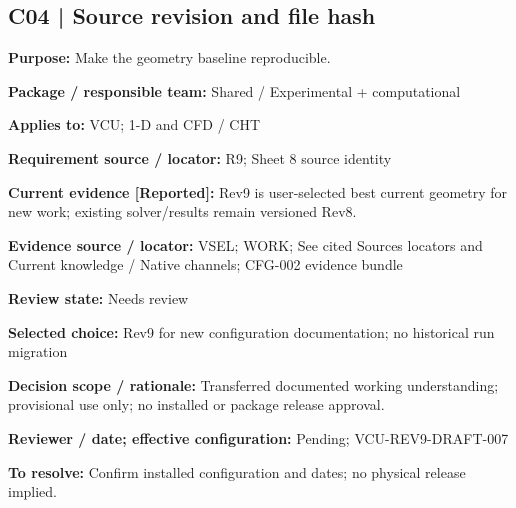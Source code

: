 \documentclass[11pt]{article}
\begin{document}
\par\noindent\begin{minipage}{\textwidth}\small\setlength{\parskip}{2pt}
\subsection*{C04 | Source revision and file hash}
\textbf{Purpose:} Make the geometry baseline reproducible.\par
\textbf{Package / responsible team:} Shared / Experimental + computational\par
\textbf{Applies to:} VCU; 1-D and CFD / CHT\par
\textbf{Requirement source / locator:} R9; Sheet 8 source identity\par
\textbf{Current evidence [Reported]:} Rev9 is user-selected best current geometry for new work; existing solver/results remain versioned Rev8.\par
\textbf{Evidence source / locator:} VSEL; WORK; See cited Sources locators and Current knowledge / Native channels; CFG-002 evidence bundle\par
\textbf{Review state:} Needs review\par
\textbf{Selected choice:} Rev9 for new configuration documentation; no historical run migration\par
\textbf{Decision scope / rationale:} Transferred documented working understanding; provisional use only; no installed or package release approval.\par
\textbf{Reviewer / date; effective configuration:} Pending; VCU-REV9-DRAFT-007\par
\textbf{To resolve:} Confirm installed configuration and dates; no physical release implied.\par
\end{minipage}\par\vspace{5pt}
\end{document}
